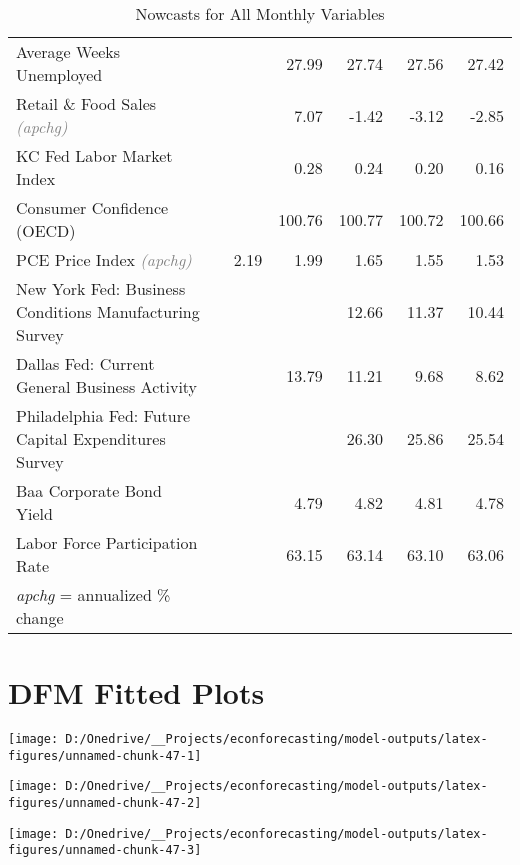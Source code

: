 \documentclass[11pt, letterpaper]{article}\usepackage[]{graphicx}\usepackage[]{color}
\begin{document}
\begin{table}[H]
\begin{tabular}{lrrrrrr}
  Average Weeks Unemployed &  &  & 27.99 & 27.74 & 27.56 & 27.42 \\ 
  Retail \& Food Sales \textit{\footnotesize\textcolor{gray}{(apchg)}} &  &  & 7.07 & -1.42 & -3.12 & -2.85 \\ 
  KC Fed Labor Market Index &  &  & 0.28 & 0.24 & 0.20 & 0.16 \\ 
  Consumer Confidence (OECD) &  &  & 100.76 & 100.77 & 100.72 & 100.66 \\ 
  PCE Price Index \textit{\footnotesize\textcolor{gray}{(apchg)}} &  & 2.19 & 1.99 & 1.65 & 1.55 & 1.53 \\ 
  New York Fed: Business Conditions Manufacturing Survey &  &  &  & 12.66 & 11.37 & 10.44 \\ 
  Dallas Fed: Current General Business Activity &  &  & 13.79 & 11.21 & 9.68 & 8.62 \\ 
  Philadelphia Fed: Future Capital Expenditures Survey &  &  &  & 26.30 & 25.86 & 25.54 \\ 
  Baa Corporate Bond Yield &  &  & 4.79 & 4.82 & 4.81 & 4.78 \\ 
  Labor Force Participation Rate &  &  & 63.15 & 63.14 & 63.10 & 63.06 \\ 
   \hline 
 \textit{apchg} = annualized \% change 
\end{tabular}
\endgroup
\caption{Nowcasts for All Monthly Variables} 
\end{table}



\appendix
\appendixpage
\addappheadtotoc

\section{DFM Fitted Plots}


{\centering \texttt{[image: D:/Onedrive/\_\_Projects/econforecasting/model-outputs/latex-figures/unnamed-chunk-47-1]} 

}




{\centering \texttt{[image: D:/Onedrive/\_\_Projects/econforecasting/model-outputs/latex-figures/unnamed-chunk-47-2]} 

}




{\centering \texttt{[image: D:/Onedrive/\_\_Projects/econforecasting/model-outputs/latex-figures/unnamed-chunk-47-3]} 

}
\end{document}
